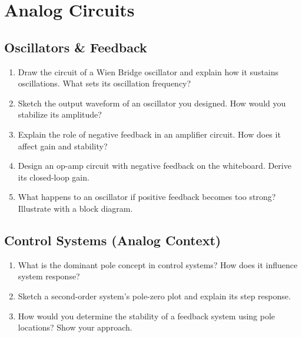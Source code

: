 \section{Analog Circuits}
\label{sec:iq-analog}

\subsection{Oscillators \& Feedback}

\begin{enumerate}[label=\textbf{A\arabic*.}, leftmargin=*, itemsep=6pt]

  \item Draw the circuit of a Wien Bridge oscillator and explain how it sustains
        oscillations. What sets its oscillation frequency?

  \item Sketch the output waveform of an oscillator you designed. How would you
        stabilize its amplitude?

  \item Explain the role of negative feedback in an amplifier circuit. How does
        it affect gain and stability?

  \item Design an op-amp circuit with negative feedback on the whiteboard. Derive
        its closed-loop gain.

  \item What happens to an oscillator if positive feedback becomes too strong?
        Illustrate with a block diagram.

\end{enumerate}

\subsection{Control Systems (Analog Context)}

\begin{enumerate}[label=\textbf{A\arabic*.}, leftmargin=*, itemsep=6pt, start=6]

  \item What is the dominant pole concept in control systems? How does it
        influence system response?

  \item Sketch a second-order system's pole-zero plot and explain its step
        response.

  \item How would you determine the stability of a feedback system using pole
        locations? Show your approach.

\end{enumerate}

